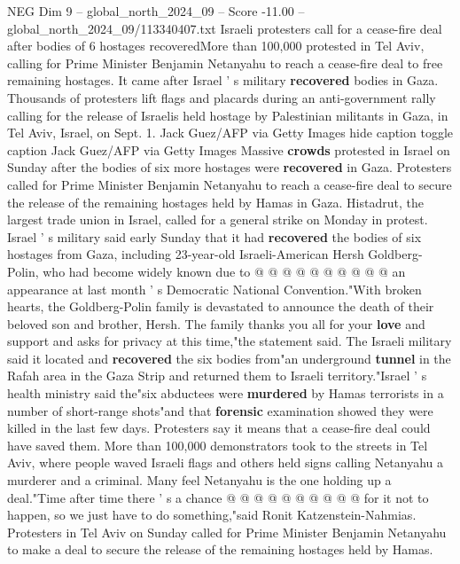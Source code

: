 \begin{textsample}{NEG Dim 9 – global\_north\_2024\_09 – Score -11.00 – global\_north\_2024\_09/113340407.txt}  \label{ex:f9_neg_010}
Israeli protesters call for a cease-fire deal after bodies of 6 hostages recoveredMore than 100,000 protested in Tel Aviv, calling for Prime Minister Benjamin Netanyahu to reach a cease-fire deal to free remaining hostages.
It came after Israel ' s military \textbf{recovered} bodies in Gaza.
Thousands of protesters lift flags and placards during an anti-government rally calling for the release of Israelis held hostage by Palestinian militants in Gaza, in Tel Aviv, Israel, on Sept. 1.
Jack Guez/AFP via Getty Images hide caption toggle caption Jack Guez/AFP via Getty Images Massive \textbf{crowds} protested in Israel on Sunday after the bodies of six more hostages were \textbf{recovered} in Gaza.
Protesters called for Prime Minister Benjamin Netanyahu to reach a cease-fire deal to secure the release of the remaining hostages held by Hamas in Gaza.
Histadrut, the largest trade union in Israel, called for a general strike on Monday in protest.
Israel ' s military said early Sunday that it had \textbf{recovered} the bodies of six hostages from Gaza, including 23-year-old Israeli-American Hersh Goldberg-Polin, who had become widely known due to @ @ @ @ @ @ @ @ @ @ an appearance at last month ' s Democratic National Convention."With broken hearts, the Goldberg-Polin family is devastated to announce the death of their beloved son and brother, Hersh.
The family thanks you all for your \textbf{love} and support and asks for privacy at this time,"the statement said.
The Israeli military said it located and \textbf{recovered} the six bodies from"an underground \textbf{tunnel} in the Rafah area in the Gaza Strip and returned them to Israeli territory."Israel ' s health ministry said the"six abductees were \textbf{murdered} by Hamas terrorists in a number of short-range shots"and that \textbf{forensic} examination showed they were killed in the last few days.
Protesters say it means that a cease-fire deal could have saved them.
More than 100,000 demonstrators took to the streets in Tel Aviv, where people waved Israeli flags and others held signs calling Netanyahu a murderer and a criminal.
Many feel Netanyahu is the one holding up a deal."Time after time there ' s a chance @ @ @ @ @ @ @ @ @ @ for it not to happen, so we just have to do something,"said Ronit Katzenstein-Nahmias.
Protesters in Tel Aviv on Sunday called for Prime Minister Benjamin Netanyahu to make a deal to secure the release of the remaining hostages held by Hamas.

\end{textsample}
